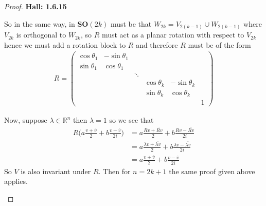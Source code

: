 \documentclass[11pt]{article}
\newcommand{\R}{\mathbb{R}}
\theoremstyle{definition}
\begin{document}
\begin{proof}{\textbf{Hall: 1.6.15}}
\begin{itemize}
    So in the same way, in $\bm{SO}(2k)$ must be that
    $W_{2k} = V_{2(k-1)} \cup W_{2(k-1)}$ where $V_{2k}$ is orthogonal
    to $W_{2k}$, so $R$ must act as a planar rotation with respect to $V_{2k}$
    hence we must add a rotation block to $R$ and therefore $R$ must be of the
    form 
    \begin{align*}
        R = \begin{pmatrix}
            \cos\theta_1 & -\sin\theta_1 &        &                & & \\
            \sin\theta_1 & \cos\theta_1  &        &                & & \\
                         &               & \ddots &                & & \\
                         &               &        & \cos\theta_{k} & -\sin\theta_{k} & \\
                         &               &        & \sin\theta_{k} & \cos\theta_{k} & \\
                         &               &        &                & & 1
        \end{pmatrix}
    \end{align*}

    Now, suppose $\lambda \in \R^n$ then $\lambda = 1$ so we see that
    \begin{align*}
        R\bigg(a\frac{v + \overline{v}}{2} + b\frac{v - \overline{v}}{2i}\bigg)
        &= a\frac{Rv + \overline{Rv}}{2} + b\frac{Rv - \overline{Rv}}{2i}\\
        &= a\frac{\lambda v + \overline{\lambda v}}{2}
        + b\frac{\lambda v - \overline{\lambda v}}{2i}\\
        &= a\frac{v + \overline{v}}{2}
        + b\frac{v - \overline{v}}{2i}
    \end{align*}
    So $V$ is also invariant under $R$. Then for $n = 2k +1$ the same proof
    given above applies.


\end{itemize}
\end{proof}
\end{document}
